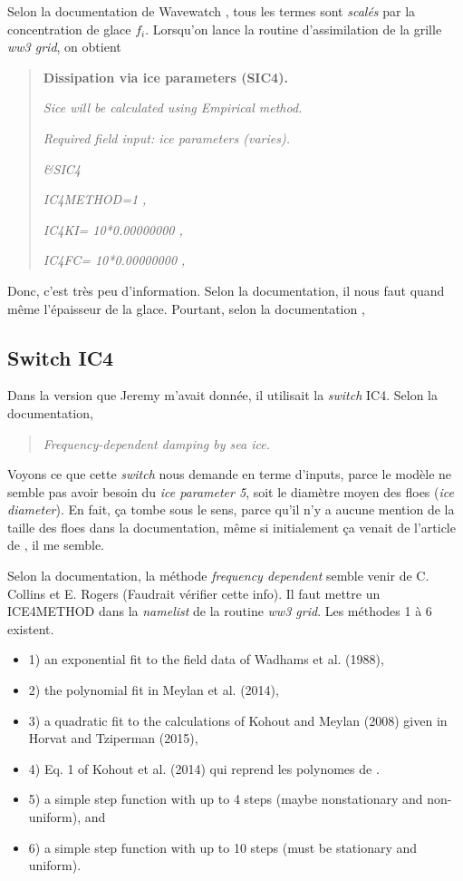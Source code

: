 \documentclass[10pt]{article}
\numberwithin{equation}{section}
\begin{document}
Selon la documentation de Wavewatch \autocite[p.16]{wwiii2016user}, tous les termes sont \emph{scalés} par la concentration de glace \(f_i\). Lorsqu'on lance la routine d'assimilation de la grille \emph{ww3 grid}, on obtient

\begin{quote}
\textbf{Dissipation via ice parameters (SIC4).}

\emph{Sice will be calculated using Empirical method.}

\emph{Required field input: ice parameters (varies).}

\emph{\&SIC4}

\emph{IC4METHOD=1          ,}

\emph{IC4KI= 10*0.00000000      ,}

\emph{IC4FC= 10*0.00000000      ,}
\end{quote}

Donc, c'est très peu d'information. Selon la documentation, il nous faut quand même l'épaisseur de la glace. Pourtant, selon la documentation \autocite{wwiii2016user}, 
\subsection{Switch IC4}
\label{sec:org083d0ab}

Dans la version que Jeremy m'avait donnée, il utilisait la \emph{switch} IC4. Selon la documentation,

\begin{quote}
\emph{Frequency-dependent damping by sea ice.}
\end{quote}

Voyons ce que cette \emph{switch} nous demande en terme d'inputs, parce le modèle ne semble pas avoir besoin du \emph{ice parameter 5}, soit le diamètre moyen des floes (\emph{ice diameter}). En fait, ça tombe sous le sens, parce qu'il n'y a aucune mention de la taille des floes dans la documentation, même si initialement ça venait de l'article de \Textcite{kohout2008elastic}, il me semble. \medskip

Selon la documentation, la méthode \emph{frequency dependent} semble venir de C. Collins et E. Rogers (Faudrait vérifier cette info). Il faut mettre un ICE4METHOD dans la \emph{namelist} de la routine \emph{ww3 grid}. Les méthodes 1 à 6 existent.
\begin{itemize}
\item 1) an exponential fit to the field data of Wadhams et al. (1988),
\item 2) the polynomial fit in Meylan et al. (2014),
\item 3) a quadratic fit to the calculations of Kohout and Meylan (2008) given in Horvat and Tziperman (2015),
\item 4) Eq. 1 of Kohout et al. (2014) qui reprend les polynomes de \Textcite{kohout2008elastic}.
\item 5) a simple step function with up to 4 steps (maybe nonstationary and non-uniform), and
\item 6) a simple step function with up to 10 steps (must be stationary and uniform).
\end{itemize}
\end{document}
